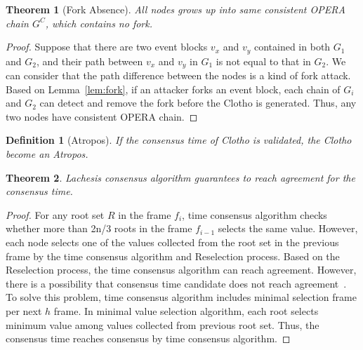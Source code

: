 \documentclass{article}
\newtheorem{thm}{Theorem}[section]
\newtheorem{prop}[thm]{Proposition}
\newtheorem{defn}{Definition}[section]
\begin{document}
\begin{thm}[Fork Absence]
\label{thm:same}
All nodes grows up into same consistent OPERA chain $G^C$, which contains no fork.
\end{thm}
\begin{proof}
 Suppose that there are two event blocks $v_x$ and $v_y$ contained in both $G_1$ and $G_2$, and their path between $v_x$ and $v_y$ in $G_1$ is not equal to that in $G_2$. We can consider that the path difference between the nodes is a kind of fork attack. Based on Lemma~\ref{lem:fork}, if an attacker forks an event block, each chain of $G_i$ and $G_2$ can detect and remove the fork before the Clotho is generated. Thus, any two nodes have consistent OPERA chain. 
\end{proof}



\begin{defn}[Atropos]
	If the consensus time of Clotho is validated, the Clotho become an Atropos. 
\end{defn}


%


\begin{thm}
\label{thm:ct}
Lachesis consensus algorithm guarantees to reach agreement for the consensus time.
\end{thm}

\begin{proof}
For any root set $R$ in the frame $f_{i}$, time consensus algorithm checks whether more than 2n/3 roots in the frame $f_{i-1}$ selects the same value. However, each node selects one of the values collected from the root set in the previous frame by the time consensus algorithm and Reselection process. Based on the Reselection process, the time consensus algorithm can reach agreement. However, there is a possibility that consensus time candidate does not reach agreement~\cite{Fischer85}. To solve this problem, time consensus algorithm includes minimal selection frame per next $h$ frame. In minimal value selection algorithm, each root selects minimum value among values collected from previous root set. Thus, the consensus time reaches consensus by time consensus algorithm.
\end{proof}
\end{document}
